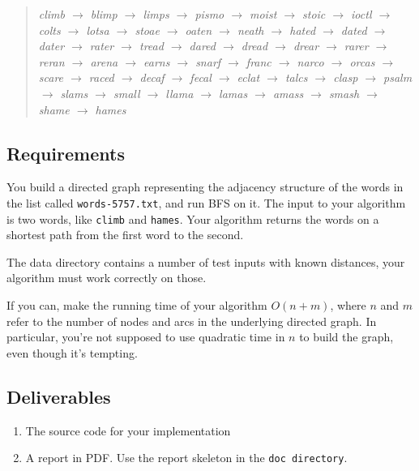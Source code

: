 \documentclass{tufte-handout}
\begin{document}
\begin{fullwidth}
\begin{quotation}\em
climb $\rightarrow$ blimp $\rightarrow$ limps $\rightarrow$ pismo $\rightarrow$ moist $\rightarrow$ stoic $\rightarrow$ ioctl $\rightarrow$ colts $\rightarrow$ lotsa $\rightarrow$ stoae $\rightarrow$ oaten $\rightarrow$ neath $\rightarrow$ hated $\rightarrow$ dated $\rightarrow$ dater $\rightarrow$ rater $\rightarrow$ tread $\rightarrow$ dared $\rightarrow$ dread $\rightarrow$ drear $\rightarrow$ rarer $\rightarrow$ reran $\rightarrow$ arena $\rightarrow$ earns $\rightarrow$ snarf $\rightarrow$ franc $\rightarrow$ narco $\rightarrow$ orcas $\rightarrow$ scare $\rightarrow$ raced $\rightarrow$ decaf $\rightarrow$ fecal $\rightarrow$ eclat $\rightarrow$ talcs $\rightarrow$ clasp $\rightarrow$ psalm $\rightarrow$ slams $\rightarrow$ small $\rightarrow$ llama $\rightarrow$ lamas $\rightarrow$ amass $\rightarrow$ smash $\rightarrow$ shame $\rightarrow$ hames
\end{quotation}
\end{fullwidth}

\subsection{Requirements}

You build a directed graph representing the adjacency structure of the words in the list called {\tt words-5757.txt}, and run BFS on it. 
The input to your algorithm is two words, like {\tt climb} and {\tt hames}.
Your algorithm returns the words on a shortest path from the first word to the second.

The data directory contains a number of test inputs with known distances, your algorithm must work correctly on those.

If you can, make the running time of your algorithm  $O(n+m)$, where $n$ and $m$ refer to the number of nodes and arcs in the underlying directed graph. 
In particular, you’re not supposed to use quadratic time in $n$ to build the graph, even though it’s tempting.

\subsection{Deliverables}

\begin{enumerate}
  \item The source code for your implementation
  \item A report in PDF.
  Use the report skeleton in the {\tt doc directory}.
  \end{enumerate}
\end{document}

